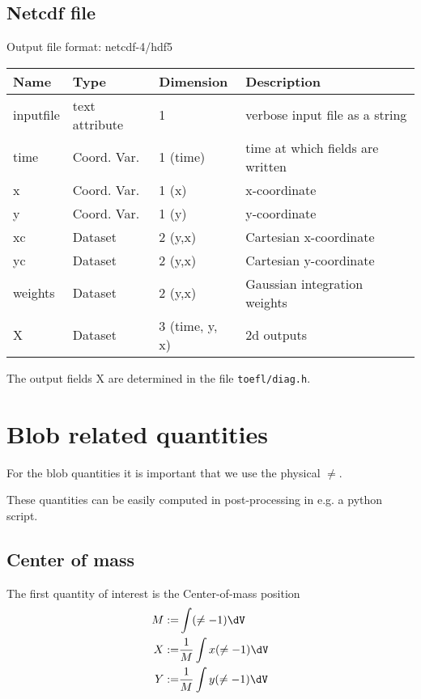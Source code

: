 \subsection{Netcdf file}
Output file format: netcdf-4/hdf5

\begin{longtable}{lll>{\RaggedRight}p{7cm}}
\toprule
\rowcolor{gray!50}\textbf{Name} &  \textbf{Type} & \textbf{Dimension} & \textbf{Description}  \\ \midrule
inputfile        & text attribute & 1 & verbose input file as a string \\
time             & Coord. Var. & 1 (time) & time at which fields are written \\
x                & Coord. Var. & 1 (x) & x-coordinate  \\
y                & Coord. Var. & 1 (y) & y-coordinate \\
xc               & Dataset & 2 (y,x) & Cartesian x-coordinate  \\
yc               & Dataset & 2 (y,x) & Cartesian y-coordinate \\
weights          & Dataset & 2 (y,x) & Gaussian integration weights \\
X                & Dataset & 3 (time, y, x) & 2d outputs \\
\bottomrule
\end{longtable}
The output fields X are determined in the file \texttt{toefl/diag.h}.

\section{Blob related quantities}
For the blob quantities it is important that we use the physical $\ne$.
\begin{tcolorbox}[title=Note]
    These quantities can be easily computed in post-processing in e.g. a python script.
\end{tcolorbox}

\subsection{Center of mass}
The first quantity of interest is the Center-of-mass position
\begin{align}
    M :=& \int (\ne -1 ) \dV \\
    X :=& \frac{1}{M} \int x(\ne - 1) \dV \\
    Y :=& \frac{1}{M} \int y(\ne - 1) \dV
\end{align}
